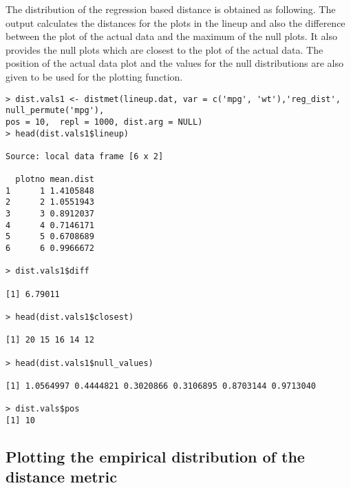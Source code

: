 The distribution of the regression based distance is obtained as following. The output calculates the distances for the plots in the lineup and also the difference between the plot of the actual data and the maximum of the null plots. It also provides the null plots which are closest to the plot of the actual data. The position of the actual data plot and the values for the null distributions are also given to be used for the plotting function. 

\begin{verbatim}
> dist.vals1 <- distmet(lineup.dat, var = c('mpg', 'wt'),'reg_dist', null_permute('mpg'), 
pos = 10,  repl = 1000, dist.arg = NULL)
> head(dist.vals1$lineup)

Source: local data frame [6 x 2]

  plotno mean.dist
1      1 1.4105848
2      2 1.0551943
3      3 0.8912037
4      4 0.7146171
5      5 0.6708689
6      6 0.9966672

> dist.vals1$diff

[1] 6.79011

> head(dist.vals1$closest)

[1] 20 15 16 14 12

> head(dist.vals1$null_values)

[1] 1.0564997 0.4444821 0.3020866 0.3106895 0.8703144 0.9713040

> dist.vals$pos
[1] 10

\end{verbatim}


\subsection{Plotting the empirical distribution of the distance
metric}\label{plotting-the-empirical-distribution-of-the-distance-metric}

